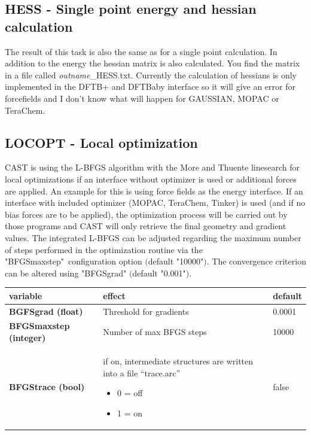 \documentclass[10pt,a4paper]{article} %
\newif\ifdevmode %
\begin{document}
	\subsection{HESS - Single point energy and hessian calculation}
	The result of this task is also the same as for a single point calculation. In addition to the energy the hessian matrix is also calculated. You find the matrix in a file called \textit{outname}\_HESS.txt. Currently the calculation of hessians is only implemented in the DFTB+ and DFTBaby interface so it will give an error for forcefields and I don't know what will happen for GAUSSIAN, MOPAC or TeraChem.
	

	\subsection{LOCOPT - Local optimization}
	\label{sec:locopt}
	\ac{CAST} is using the L-BFGS algorithm\supercite{bfgs} with the More and Thuente linesearch\supercite{morethuente} for local optimizations if an interface without optimizer is used or additional forces are applied. An example for this is using force fields as the energy interface. \ifdevmode ~\\ \colorbox{red}{what does additional forces applied mean?} ~\\ \fi
	If an interface with included optimizer (MOPAC, TeraChem, Tinker) is used (and if no bias forces are to be applied), the optimization process will be carried out by those programs and \ac{CAST} will only retrieve the final geometry and gradient values.
	The integrated L-BFGS can be adjusted regarding the maximum number of steps performed in the optimization routine via the "BFGSmaxstep"\ configuration option $($default "10000"$)$.
	The convergence criterion can be altered using "BFGSgrad" $($default "0.001"$)$.

	\begin{longtable}{|p{3.5cm}|p{5cm}|p{3cm}|}
		variable & effect & default \\
		\hline
		\textbf{BGFSgrad (float)} & Threshold for gradients & 0.0001 \\
		\textbf{BFGSmaxstep (integer)} & Number of max BFGS steps & 10000 \\
		\textbf{BFGStrace (bool)} & if on, intermediate structures are written into a file ``trace.arc'' \begin{itemize} \item 0 = off \item 1 = on\end{itemize} & false \\
	\end{longtable}
\end{document}
